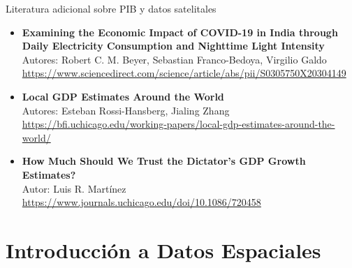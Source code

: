 \documentclass{beamer}
\begin{document}
\begin{frame}{Literatura adicional sobre PIB y datos satelitales}
\begin{itemize}
    \item \textbf{Examining the Economic Impact of COVID-19 in India through Daily Electricity Consumption and Nighttime Light Intensity} \\
    Autores: Robert C. M. Beyer, Sebastian Franco-Bedoya, Virgilio Galdo \\
    \href{https://www.sciencedirect.com/science/article/abs/pii/S0305750X20304149}{https://www.sciencedirect.com/science/article/abs/pii/S0305750X20304149}

    \item \textbf{Local GDP Estimates Around the World} \\
    Autores: Esteban Rossi-Hansberg, Jialing Zhang \\
    \href{https://bfi.uchicago.edu/working-papers/local-gdp-estimates-around-the-world/}{https://bfi.uchicago.edu/working-papers/local-gdp-estimates-around-the-world/}
    
    \item \textbf{How Much Should We Trust the Dictator’s GDP Growth Estimates?} \\
    Autor: Luis R. Martínez \\
    \href{https://www.journals.uchicago.edu/doi/10.1086/720458}{https://www.journals.uchicago.edu/doi/10.1086/720458}
\end{itemize}
\end{frame}

\section{Introducción a Datos Espaciales}
\begin{frame}[noframenumbering]
\tableofcontents[currentsection]
\end{frame}
\end{document}
